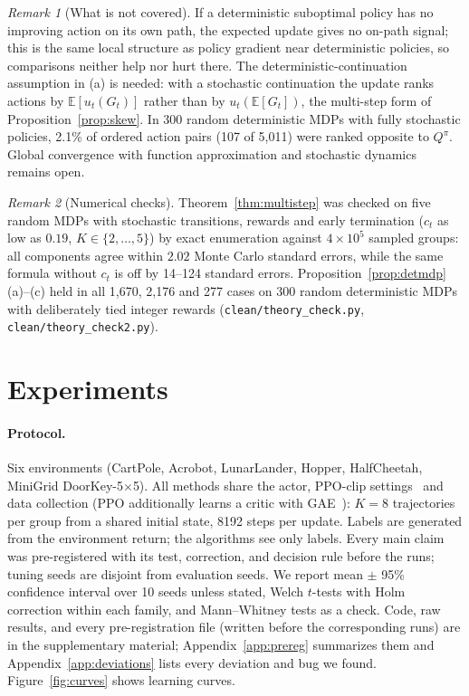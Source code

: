 \documentclass[11pt]{article}
\theoremstyle{remark}
\newtheorem{remark}{Remark}
\newcommand{\E}{\mathbb{E}}
\begin{document}
\begin{remark}[What is not covered]
If a deterministic suboptimal policy has no improving action on its own path, the expected update gives no on-path signal; this is the same local structure as policy gradient near deterministic policies, so comparisons neither help nor hurt there. The deterministic-continuation assumption in (a) is needed: with a stochastic continuation the update ranks actions by $\E[u_t(G_t)]$ rather than by $u_t(\E[G_t])$, the multi-step form of Proposition~\ref{prop:skew}. In 300 random deterministic MDPs with fully stochastic policies, 2.1\% of ordered action pairs (107 of 5{,}011) were ranked opposite to $Q^\pi$. Global convergence with function approximation and stochastic dynamics remains open.
\end{remark}

\begin{remark}[Numerical checks]
Theorem~\ref{thm:multistep} was checked on five random MDPs with stochastic transitions, rewards and early termination ($c_t$ as low as $0.19$, $K\in\{2,\dots,5\}$) by exact enumeration against $4\times10^5$ sampled groups: all components agree within $2.02$ Monte Carlo standard errors, while the same formula without $c_t$ is off by 14--124 standard errors. Proposition~\ref{prop:detmdp}(a)--(c) held in all 1{,}670, 2{,}176 and 277 cases on 300 random deterministic MDPs with deliberately tied integer rewards (\texttt{clean/theory\_check.py}, \texttt{clean/theory\_check2.py}).
\end{remark}

\section{Experiments}
\label{sec:experiments}

\paragraph{Protocol.}
Six environments (CartPole, Acrobot, LunarLander, Hopper, HalfCheetah, MiniGrid DoorKey-5$\times$5). All methods share the actor, PPO-clip settings~\citep{schulman2017ppo} and data collection (PPO additionally learns a critic with GAE~\citep{schulman2016gae}): $K=8$ trajectories per group from a shared initial state, 8192 steps per update. Labels are generated from the environment return; the algorithms see only labels. Every main claim was pre-registered with its test, correction, and decision rule before the runs; tuning seeds are disjoint from evaluation seeds. We report mean $\pm$ 95\% confidence interval over 10 seeds unless stated, Welch $t$-tests with Holm correction within each family, and Mann--Whitney tests as a check. Code, raw results, and every pre-registration file (written before the corresponding runs) are in the supplementary material; Appendix~\ref{app:prereg} summarizes them and Appendix~\ref{app:deviations} lists every deviation and bug we found. Figure~\ref{fig:curves} shows learning curves.
\end{document}
